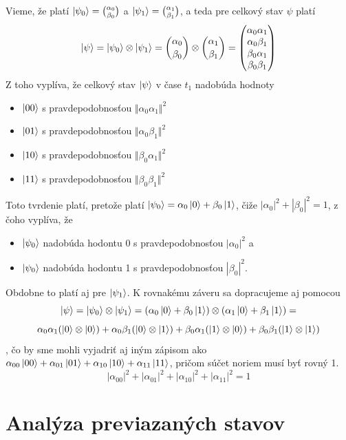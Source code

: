Vieme, že platí \(\ket{\psi_0} = \binom{\alpha_0}{\beta_0}\) a  
\(\ket{\psi_1} = \binom{\alpha_1}{\beta_1}\), a teda pre celkový stav \(\psi\) 
platí 
\[
\ket{\psi} = \ket{\psi_0} \otimes \ket{\psi_1} = \binom{\alpha_0}{\beta_0}
\otimes \binom{\alpha_1}{\beta_1} = 
\begin{pmatrix}
    \alpha_0\alpha_1 \\
    \alpha_0\beta_1 \\
    \beta_0\alpha_1 \\
    \beta_0\beta_1
\end{pmatrix}
\]
Z toho vyplíva, že celkový stav \(\ket{\psi}\) v čase \(t_1\) nadobúda 
hodnoty
\begin{itemize}
    \item[] \(\ket{00}\) s pravdepodobnosťou \(\Vert \alpha_0\alpha_1 \Vert^2\)
    \item[] \(\ket{01}\) s pravdepodobnosťou \(\Vert \alpha_0\beta_1 \Vert^2\)
    \item[] \(\ket{10}\) s pravdepodobnosťou \(\Vert \beta_0\alpha_1 \Vert^2\)
    \item[] \(\ket{11}\) s pravdepodobnosťou \(\Vert \beta_0\beta_1 \Vert^2\)
\end{itemize}

Toto tvrdenie platí, pretože platí 
\(\ket{\psi_0} = \alpha_0\ket{0} + \beta_0\ket{1}\), čiže 
\(|\alpha_0|^2 + |\beta_0|^2 = 1\), z čoho vyplíva, že 
\begin{itemize}
    \item[] \(\ket{\psi_0}\) nadobúda hodontu 0 s 
pravdepodobnosťou \(|\alpha_0|^2\) a 
    \item[] \(\ket{\psi_0}\) nadobúda hodontu 1 s 
pravdepodobnosťou \(|\beta_0|^2\).
\end{itemize}
Obdobne to platí aj pre \(\ket{\psi_1}\). K rovnakému záveru sa dopracujeme
aj pomocou 
\[\ket{\psi} = \ket{\psi_0} \otimes \ket{\psi_1} = 
(\alpha_0\ket{0} + \beta_0\ket{1}) \otimes  (\alpha_1\ket{0} + \beta_1\ket{1}) =
\]
\[
\alpha_0\alpha_1 (\ket{0} \otimes \ket{0}) +  
\alpha_0\beta_1 (\ket{0} \otimes \ket{1}) + 
\beta_0\alpha_1 (\ket{1} \otimes \ket{0}) + 
\beta_0\beta_1 (\ket{1} \otimes \ket{1}) 
\]
, čo by sme mohli vyjadriť aj iným zápisom ako 
\(
\alpha_{00}\ket{00} + \alpha_{01}\ket{01} + 
\alpha_{10}\ket{10} + \alpha_{11}\ket{11}
\), pričom súčet noriem musí byť rovný 1.
\[
|\alpha_{00}|^2 + |\alpha_{01}|^2 + |\alpha_{10}|^2 + |\alpha_{11}|^2 = 1\]

\section{Analýza previazaných stavov}

